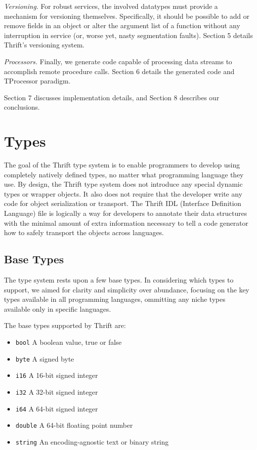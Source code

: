 \documentclass[nocopyrightspace,blockstyle]{sigplanconf}
\begin{document}
\textit{Versioning.} For robust services, the involved datatypes must
provide a mechanism for versioning themselves. Specifically,
it should be possible to add or remove fields in an object or alter the
argument list of a function without any interruption in service (or,
worse yet, nasty segmentation faults). Section 5 details Thrift's versioning
system.

\textit{Processors.} Finally, we generate code capable of processing data
streams to accomplish remote procedure calls. Section 6 details the generated
code and TProcessor paradigm.

Section 7 discusses implementation details, and Section 8 describes
our conclusions.

\section{Types}

The goal of the Thrift type system is to enable programmers to develop using
completely natively defined types, no matter what programming language they
use. By design, the Thrift type system does not introduce any special dynamic
types or wrapper objects. It also does not require that the developer write
any code for object serialization or transport. The Thrift IDL (Interface
Definition Language) file is
logically a way for developers to annotate their data structures with the
minimal amount of extra information necessary to tell a code generator
how to safely transport the objects across languages.

\subsection{Base Types}

The type system rests upon a few base types. In considering which types to
support, we aimed for clarity and simplicity over abundance, focusing
on the key types available in all programming languages, ommitting any
niche types available only in specific languages.

The base types supported by Thrift are:
\begin{itemize}
\item \texttt{bool} A boolean value, true or false
\item \texttt{byte} A signed byte
\item \texttt{i16} A 16-bit signed integer
\item \texttt{i32} A 32-bit signed integer
\item \texttt{i64} A 64-bit signed integer
\item \texttt{double} A 64-bit floating point number
\item \texttt{string} An encoding-agnostic text or binary string
\end{itemize}
\end{document}
